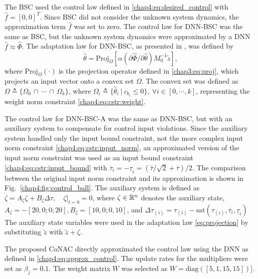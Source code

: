 The BSC used the control law defined in \eqref{chap4:eq:desired_control} with $\hat f=[0,0]^T$. Since BSC did not consider the unknown system dynamics, the approximation term $\hat f$ was set to zero.
The control law for DNN-BSC was the same as BSC, but the unknown system dynamics were approximated by a DNN \ie $\hat f\approx \hat\Phi$. The adaptation law for DNN-BSC, as presented in \cite{RN13}, was defined by 
\begin{equation}\label{eq:projection}
\dot {\hat\theta}= \text{Proj}_{\Omega}[\alpha  (\partial \hat\Phi/\partial \hat\theta)M_0^{-1}{\tilde z}],
\end{equation}
where $\text{Proj}_{\Omega}(\cdot)$ is the projection operator defined in \eqref{chap3:eq:proj}, which projects an input vector onto a convex set $\Omega$. The convex set was defined as ${\Omega}\triangleq \{\Omega_0\,\cap\,\cdots\,\cap\, \Omega_k\}$, where $\Omega_i\triangleq \{\hat\theta_i\ \vert \ c_{b_i}\le 0\}, \ \forall i\in[0,\cdots, k]$, representing the weight norm constraint \eqref{chap4:eq:cstr:weight}.

The control law for DNN-BSC-A was the same as DNN-BSC, but with an auxiliary system to compensate for control input violations. Since the auxiliary system handled only the input bound constraint, not the more complex input norm constraint \eqref{chap4:eq:cstr:input_norm}, an approximated version of the input norm constraint was used as an input bound constraint \eqref{chap4:eq:cstr:input_bound} with ${\overline\tau_i} = -{\underline\tau_i} = (\bar\tau/\sqrt{2}+\bar\tau)/2$. The comparison between the original input norm constraint and its approximation is shown in Fig.~\ref{chap4:fig:control_ball}.
The auxiliary system is defined as $\dot\zeta = A_\zeta \zeta + B_\zeta \Delta\tau,\quad \zeta\vert_{t=0} = 0$, where $\zeta\in\mathbb{R}^n$ denotes the auxiliary state, $A_\zeta=-[20,0;0;20],B_\zeta=[10,0;0,10]$, and $\Delta\tau_{(i)} = 
\tau_{(i)}-\text{sat}(\tau_{(i)},{\overline\tau_i},{\underline\tau_i})$
The auxiliary state variables were used in the adaptation law \eqref{eq:projection} by substituting ${\tilde z}$ with ${\tilde z}+\zeta$.

The proposed CoNAC directly approximated the control law using the DNN as defined in \eqref{chap4:eq:approx_control}. The update rates for the multipliers were set as $\beta_{j}=0.1$. The weight matrix $W$ was selected as $W=\text{diag}([5,1,15,15])]$.

